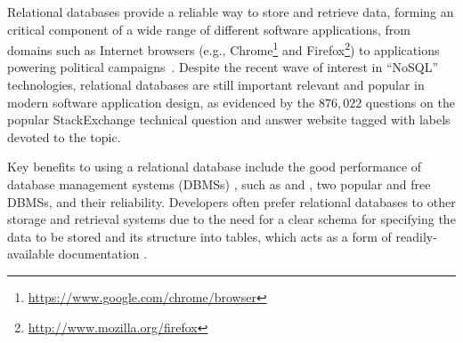 %
%
%
%

\begin{sloppypar}
Relational databases provide a reliable way to store and retrieve data, forming an critical component of a wide range of different software applications, from domains such as Internet browsers (e.g., Chrome\footnote{\url{https://www.google.com/chrome/browser}} and Firefox\footnote{\url{http://www.mozilla.org/firefox}}) to applications powering political campaigns~\cite{Butler2012}. Despite the recent wave of interest in ``NoSQL'' technologies, relational databases are still important relevant and popular in modern software application design, as evidenced by the $876,022$ questions on the popular StackExchange technical question and answer website tagged with labels devoted to the topic.
\end{sloppypar}

Key benefits to using a relational database include the good performance of database management systems (DBMSs) \cite{Abrahami2015}, such as \Postgres and \SQLite, two popular and free DBMSs, and their reliability. Developers often prefer relational databases to other storage and retrieval systems due to the need for a clear schema for specifying the data to be stored and its structure into tables, which acts as a form of readily-available documentation \cite{}. 

